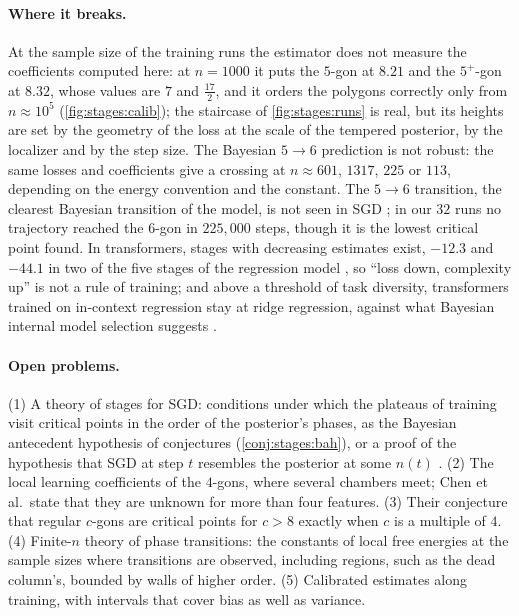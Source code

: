 \begin{refsection}
\paragraph{Where it breaks.} At the sample size of the training runs the estimator does not measure the coefficients computed here: at $n=1000$ it puts the $5$-gon at $8.21$ and the $5^+$-gon at $8.32$, whose values are $7$ and $\frac{17}2$, and it orders the polygons correctly only from $n\approx10^5$ (\cref{fig:stages:calib}); the staircase of \cref{fig:stages:runs} is real, but its heights are set by the geometry of the loss at the scale of the tempered posterior, by the localizer and by the step size. The Bayesian $5\to6$ prediction is not robust: the same losses and coefficients give a crossing at $n\approx601$, $1317$, $225$ or $113$, depending on the energy convention and the constant. The $5\to6$ transition, the clearest Bayesian transition of the model, is not seen in SGD \parencite{ChenEtAl2023}; in our $32$ runs no trajectory reached the $6$-gon in $225{,}000$ steps, though it is the lowest critical point found. In transformers, stages with decreasing estimates exist, $-12.3$ and $-44.1$ in two of the five stages of the regression model \parencite{HooglandEtAl2025}, so ``loss down, complexity up'' is not a rule of training; and above a threshold of task diversity, transformers trained on in-context regression stay at ridge regression, against what Bayesian internal model selection suggests \parencite{CarrollEtAl2025}.

\paragraph{Open problems.} (1) A theory of stages for SGD: conditions under which the plateaus of training visit critical points in the order of the posterior's phases, as the Bayesian antecedent hypothesis of \textcite{ChenEtAl2023} conjectures (\cref{conj:stages:bah}), or a proof of the hypothesis that SGD at step $t$ resembles the posterior at some $n(t)$ \parencite{PepinLehalleurEtAl2025}. (2) The local learning coefficients of the $4$-gons, where several chambers meet; Chen et al.\ state that they are unknown for more than four features. (3) Their conjecture that regular $c$-gons are critical points for $c>8$ exactly when $c$ is a multiple of $4$. (4) Finite-$n$ theory of phase transitions: the constants of local free energies at the sample sizes where transitions are observed, including regions, such as the dead column's, bounded by walls of higher order. (5) Calibrated estimates along training, with intervals that cover bias as well as variance.


\end{refsection}
